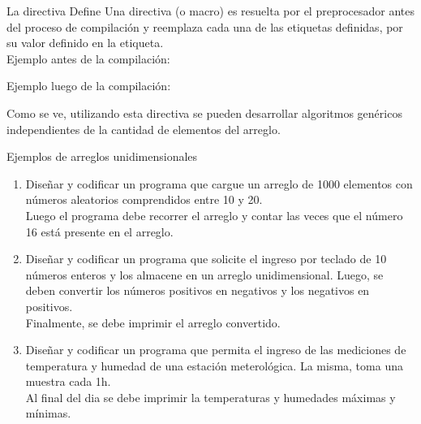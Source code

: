 \documentclass[xcolor=pdftex,table,11pt]{beamer}
\begin{document}
\begin{frame}{La directiva Define}
Una directiva (o macro) es resuelta por el preprocesador antes del proceso de compilación y reemplaza cada una de las etiquetas definidas, por su valor definido en la etiqueta.\\
\vspace{0.5cm}
Ejemplo antes de la compilación:
\codesetstylefrombeamer
{}

Ejemplo luego de la compilación:
\codesetstylefrombeamer
{}


\vspace{0.5cm}
Como se ve, utilizando esta directiva se pueden desarrollar algoritmos genéricos independientes de la cantidad de elementos del arreglo.



\end{frame}




\begin{frame}{Ejemplos de arreglos unidimensionales}
 \begin{enumerate}
   
        \item Diseñar y codificar un programa que cargue un arreglo de 1000 elementos con números aleatorios comprendidos entre 10 y 20.\\
   Luego el programa debe recorrer el arreglo y contar las veces que el número 16 está presente en el arreglo.
\href{https://github.com/danis963/informaticaI_IUA/blob/main/c/src/5-break_cont_1.c}{}


     \item Diseñar y codificar un programa que solicite el ingreso por teclado de 10 números enteros y los almacene en un arreglo unidimensional. Luego, se deben convertir los números positivos en negativos y los negativos en positivos.\\
Finalmente, se debe imprimir el arreglo convertido.
\href{https://github.com/danis963/informaticaI_IUA/blob/main/c/src/5-break_cont_1.c}{}

        \item Diseñar y codificar un programa que permita el ingreso de las mediciones de temperatura y humedad de una estación meterológica. La misma, toma una muestra cada 1h. \\
        Al final del dia se debe imprimir la temperaturas y humedades máximas y mínimas.
\href{https://github.com/danis963/informaticaI_IUA/blob/main/c/src/5-break_cont_1.c}{}

   \end{enumerate}
\end{frame}
\end{document}
